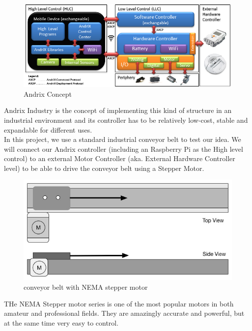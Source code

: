 \documentclass[11pt,a4paper]{article}
\begin{document}
\begin{figure}[htp]
	\centering
	\includegraphics[scale=0.7]{img/Andrix_concept_v3.png}
	\caption{Andrix Concept}
	\label{fig:Andrix Concept v3}
\end{figure}

Andrix Industry is the concept of implementing this kind of structure in an industrial environment and its controller has to be relatively low-cost, stable and expandable for different uses.\\

In this project, we use a standard industrial conveyor belt to test our idea. We will connect  our Andrix controller (including an Raspberry Pi as the High level control) to an external Motor Controller (aka. External Hardware Controller level) to be able to drive the conveyor belt using a Stepper Motor.\\

\begin{figure}[htp]
	\centering
	\includegraphics[scale=0.5]{img/Axis_plan.jpg}
	\caption{conveyor belt with NEMA stepper motor}
	\label{fig:Axis Plan}
\end{figure}


THe NEMA Stepper motor series is one of the most popular motors in both amateur and professional fields. They are amazingly  accurate and powerful, but at the same time very easy to control.
\end{document}
